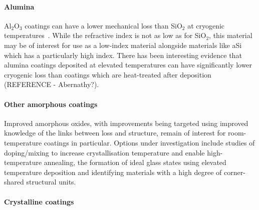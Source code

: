 \paragraph{Alumina} Al$_2$O$_3$ coatings can have a lower mechanical loss than SiO$_2$ at cryogenic temperatures~\cite{RobieThesis}. While the refractive index is not as low as for SiO$_2$, this material may be of interest for use as a low-index material alongside materials like aSi which has a particularly high index. There has been interesting evidence that alumina coatings deposited at elevated temperatures can have significantly lower cryogenic loss than coatings which are heat-treated after deposition (REFERENCE - Abernathy?).

\paragraph{Other amorphous coatings}
Improved amorphous oxides, with improvements being targeted using improved knowledge of the links between loss and structure, remain of interest for room-temperature coatings in particular. Options under investigation include studies of doping/mixing to increase crystallisation temperature and enable high-temperature annealing, the formation of ideal glass states using elevated temperature deposition and identifying materials with a high degree of corner-shared structural units. 

\paragraph{Crystalline coatings}

